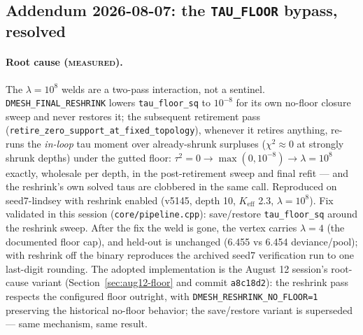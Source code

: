 \subsection{Addendum 2026-08-07: the \texttt{TAU\_FLOOR} bypass, resolved}
\label{sec:aug7-taufloor}

\paragraph{Root cause (\textsc{measured}).} The $\lambda=10^8$ welds are a
two-pass interaction, not a sentinel. \texttt{DMESH\_FINAL\_RESHRINK} lowers
\texttt{tau\_floor\_sq} to $10^{-8}$ for its own no-floor closure sweep and
never restores it; the subsequent retirement pass
(\texttt{retire\_zero\_support\_at\_fixed\_topology}), whenever it retires
anything, re-runs the \emph{in-loop} tau moment over already-shrunk
surpluses ($\chi^2\approx0$ at strongly shrunk depths) under the gutted
floor: $\tau^2=0\to\max(0,10^{-8})\to\lambda=10^8$ exactly, wholesale per
depth, in the post-retirement sweep and final refit --- and the reshrink's
own solved taus are clobbered in the same call. Reproduced on
seed7-lindsey with reshrink enabled (v5145, depth 10, $K_{\mathrm{eff}}$
2.3, $\lambda=10^8$). Fix validated in this session
(\texttt{core/pipeline.cpp}): save/restore \texttt{tau\_floor\_sq} around
the reshrink sweep. After the fix the weld is gone, the vertex carries
$\lambda=4$ (the documented floor cap), and held-out is unchanged (6.455
vs 6.454 deviance/pool); with reshrink off the binary reproduces the
archived seed7 verification run to one last-digit rounding. The adopted
implementation is the August 12 session's root-cause variant
(Section~\ref{sec:aug12-floor} and commit \texttt{a8c18d2}): the
reshrink pass respects the configured floor outright, with
\texttt{DMESH\_RESHRINK\_NO\_FLOOR=1} preserving the historical no-floor
behavior; the save/restore variant is superseded --- same mechanism, same
result.

